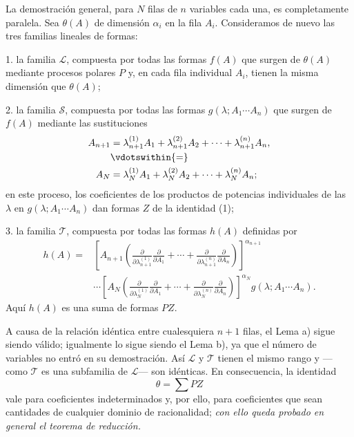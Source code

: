 \documentclass[11pt]{article}
\begin{document}
La demostración general, para $N$ filas de $n$ variables cada una, es completamente paralela. Sea $\theta(A)$ de dimensión $\alpha_i$ en la fila $A_i$. Consideramos de nuevo las tres familias lineales de formas:

1. la familia $\mathcal L$, compuesta por todas las formas $f(A)$ que surgen de $\theta(A)$ mediante procesos polares $P$ y, en cada fila individual $A_i$, tienen la misma dimensión que $\theta(A)$;

2. la familia $\mathcal S$, compuesta por todas las formas $g(\lambda;A_1\cdots A_n)$ que surgen de $f(A)$ mediante las sustituciones
\[
\begin{aligned}
 A_{n+1}&=\lambda_{n+1}^{(1)}A_1+\lambda_{n+1}^{(2)}A_2+
        \cdots+\lambda_{n+1}^{(n)}A_n,\\
 &\vdotswithin{=}\\
 A_N&=\lambda_N^{(1)}A_1+\lambda_N^{(2)}A_2+
        \cdots+\lambda_N^{(n)}A_n;
\end{aligned}
\]
en este proceso, los coeficientes de los productos de potencias individuales de las $\lambda$ en $g(\lambda;A_1\cdots A_n)$ dan formas $Z$ de la identidad (1);

3. la familia $\mathcal T$, compuesta por todas las formas $h(A)$ definidas por
\[
\begin{aligned}
 h(A)=&\left[A_{n+1}\left(
 \frac{\partial}{\partial\lambda_{n+1}^{(1)}}\frac{\partial}{\partial A_1}
 +\cdots+
 \frac{\partial}{\partial\lambda_{n+1}^{(n)}}\frac{\partial}{\partial A_n}\right)\right]^{\alpha_{n+1}} \\
&\cdots
\left[A_N\left(
 \frac{\partial}{\partial\lambda_N^{(1)}}\frac{\partial}{\partial A_1}
 +\cdots+
 \frac{\partial}{\partial\lambda_N^{(n)}}\frac{\partial}{\partial A_n}\right)\right]^{\alpha_N}
 g(\lambda;A_1\cdots A_n).
\end{aligned}
\]
Aquí $h(A)$ es una suma de formas $PZ$.

A causa de la relación idéntica entre cualesquiera $n+1$ filas, el Lema a) sigue siendo válido; igualmente lo sigue siendo el Lema b), ya que el número de variables no entró en su demostración. Así $\mathcal L$ y $\mathcal T$ tienen el mismo rango y ---como $\mathcal T$ es una subfamilia de $\mathcal L$--- son idénticas. En consecuencia, la identidad
\[
  \theta=\sum PZ
\]
vale para coeficientes indeterminados y, por ello, para coeficientes que sean cantidades de cualquier dominio de racionalidad; \emph{con ello queda probado en general el teorema de reducción.}
\end{document}
